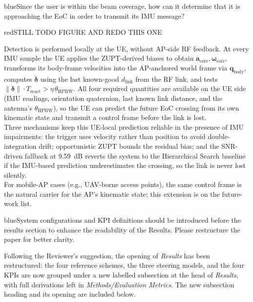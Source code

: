 \documentclass{article}
\newcommand{\blue}[1]{\begin{color}{blue}#1\end{color}}
\newcommand{\red}[1]{\begin{color}{red}#1\end{color}}
\begin{document}
\begin{tcbremark}
{\selectfont
\blue{Since the user is within the beam coverage, how can it determine that it is approaching the EoC in order to transmit its IMU message?}
}
\end{tcbremark}

\red{STILL TODO FIGURE AND REDO THIS ONE}

\noindent Detection is performed locally at the UE, without AP-side RF feedback. At every IMU sample the UE applies the ZUPT-derived biases to obtain $\mathbf{a}_{\text{corr}}, \boldsymbol{\omega}_{\text{corr}}$, transforms its body-frame velocities into the AP-anchored world frame via $\mathbf{q}_{\text{body}}$, computes $\dot{\boldsymbol{\delta}}$ using the last known-good $d_{\text{link}}$ from the RF link, and tests $\|\dot{\boldsymbol{\delta}}\| \cdot T_{\text{react}} > \eta\,\theta_{\text{HPBW}}$. All four required quantities are available on the UE side (IMU readings, orientation quaternion, last known link distance, and the antenna's $\theta_{\text{HPBW}}$), so the UE can predict the future EoC crossing from its own kinematic state and transmit a control frame before the link is lost.\\

\noindent Three mechanisms keep this UE-local prediction reliable in the presence of IMU impairments: the trigger uses velocity rather than position to avoid double-integration drift; opportunistic ZUPT bounds the residual bias; and the SNR-driven fallback at \SI{9.59}{\deci\bel} reverts the system to the Hierarchical Search baseline if the IMU-based prediction underestimates the crossing, so the link is never lost silently.\\

\noindent For mobile-AP cases (e.g., UAV-borne access points), the same control frame is the natural carrier for the AP's kinematic state; this extension is on the future-work list.

\begin{tcbremark}
{\selectfont
\blue{System configurations and KPI definitions should be introduced before the results section to enhance the readability of the Results. Please restructure the paper for better clarity.}
}
\end{tcbremark}

\noindent Following the Reviewer's suggestion, the opening of \emph{Results} has been restructured: the four reference schemes, the three steering models, and the four KPIs are now grouped under a new labelled subsection at the head of \emph{Results}, with full derivations left in \emph{Methods/Evaluation Metrics}. The new subsection heading and its opening are included below.
\end{document}
